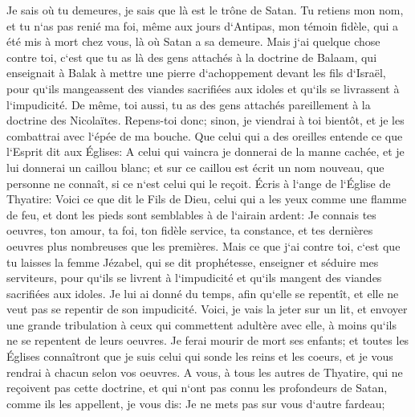 \verse Je sais où tu demeures, je sais que là est le trône de Satan. Tu retiens mon nom, et tu n`as pas renié ma foi, même aux jours d`Antipas, mon témoin fidèle, qui a été mis à mort chez vous, là où Satan a sa demeure. 
\verse Mais j`ai quelque chose contre toi, c`est que tu as là des gens attachés à la doctrine de Balaam, qui enseignait à Balak à mettre une pierre d`achoppement devant les fils d`Israël, pour qu`ils mangeassent des viandes sacrifiées aux idoles et qu`ils se livrassent à l`impudicité. 
\verse De même, toi aussi, tu as des gens attachés pareillement à la doctrine des Nicolaïtes. 
\verse Repens-toi donc; sinon, je viendrai à toi bientôt, et je les combattrai avec l`épée de ma bouche. 
\verse Que celui qui a des oreilles entende ce que l`Esprit dit aux Églises: A celui qui vaincra je donnerai de la manne cachée, et je lui donnerai un caillou blanc; et sur ce caillou est écrit un nom nouveau, que personne ne connaît, si ce n`est celui qui le reçoit. 
\verse Écris à l`ange de l`Église de Thyatire: Voici ce que dit le Fils de Dieu, celui qui a les yeux comme une flamme de feu, et dont les pieds sont semblables à de l`airain ardent: 
\verse Je connais tes oeuvres, ton amour, ta foi, ton fidèle service, ta constance, et tes dernières oeuvres plus nombreuses que les premières. 
\verse Mais ce que j`ai contre toi, c`est que tu laisses la femme Jézabel, qui se dit prophétesse, enseigner et séduire mes serviteurs, pour qu`ils se livrent à l`impudicité et qu`ils mangent des viandes sacrifiées aux idoles. 
\verse Je lui ai donné du temps, afin qu`elle se repentît, et elle ne veut pas se repentir de son impudicité. 
\verse Voici, je vais la jeter sur un lit, et envoyer une grande tribulation à ceux qui commettent adultère avec elle, à moins qu`ils ne se repentent de leurs oeuvres. 
\verse Je ferai mourir de mort ses enfants; et toutes les Églises connaîtront que je suis celui qui sonde les reins et les coeurs, et je vous rendrai à chacun selon vos oeuvres. 
\verse A vous, à tous les autres de Thyatire, qui ne reçoivent pas cette doctrine, et qui n`ont pas connu les profondeurs de Satan, comme ils les appellent, je vous dis: Je ne mets pas sur vous d`autre fardeau; 
